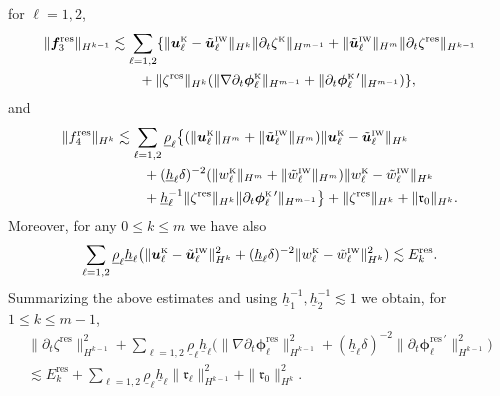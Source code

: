 \documentclass[11pt,leqno]{article}
\numberwithin{equation}{section}
\numberwithin{figure}{section}
\begin{document}
%
for $\ell=1,2$, 
%
\begin{align*}
\|\bm{f}_3^\mathrm{res}\|_{H^{k-1}}
&\lesssim \sum_{\ell=1,2}\{
 \|\bm{u}_\ell^{\mbox{\rm\tiny K}}-\tilde{\bm{u}}_\ell^{\mbox{\rm\tiny IW}}\|_{H^k}
  \|\partial_t\zeta^{\mbox{\rm\tiny K}}\|_{H^{m-1}}
 + \|\tilde{\bm{u}}_\ell^{\mbox{\rm\tiny IW}}\|_{H^m}\|\partial_t\zeta^\mathrm{res}\|_{H^{k-1}}\\
&\qquad
 + \|\zeta^\mathrm{res}\|_{H^k}( \|\nabla\partial_t \bm{\phi}_\ell^{\mbox{\rm\tiny K}}\|_{H^{m-1}}
  + \|\partial_t\bm{\phi}_\ell^{\mbox{\rm\tiny K} \, \prime}\|_{H^{m-1}} ) \},
\end{align*}
%
and 
%
\begin{align*}
\|f_4^\mathrm{res}\|_{H^k}
&\lesssim \sum_{\ell=1,2}\underline{\rho}_\ell \big\{
 (\|\bm{u}_\ell^{\mbox{\rm\tiny K}}\|_{H^m}+\|\tilde{\bm{u}}_\ell^{\mbox{\rm\tiny IW}}\|_{H^m})
 \|\bm{u}_\ell^{\mbox{\rm\tiny K}}-\tilde{\bm{u}}_\ell^{\mbox{\rm\tiny IW}}\|_{H^k} \\
&\qquad
 + (\underline{h}_\ell\delta)^{-2}(\|w_\ell^{\mbox{\rm\tiny K}}\|_{H^m}+\|\tilde{w}_\ell^{\mbox{\rm\tiny IW}}\|_{H^m})
 \|w_\ell^{\mbox{\rm\tiny K}}-\tilde{w}_\ell^{\mbox{\rm\tiny IW}}\|_{H^k} \\
&\qquad
 + \underline{h}_\ell^{-1} \|\zeta^\mathrm{res}\|_{H^k} \|\partial_t\bm{\phi}_\ell^{\mbox{\rm\tiny K} \, \prime}\|_{H^{m-1}}  \big\} 
 + \|\zeta^\mathrm{res}\|_{H^k} +\|\mathfrak{r}_0\|_{H^k}.
\end{align*}
%
Moreover, for any $0\leq k\leq m$ we have also 
%
\begin{equation}\label{estimate-uw-res}
\sum_{\ell=1,2}\underline{\rho}_\ell \underline{h}_\ell \bigl(
 \|\bm{u}_\ell^{\mbox{\rm\tiny K}}-\tilde{\bm{u}}_\ell^{\mbox{\rm\tiny IW}}\|_{H^k}^2
 + (\underline{h}_\ell\delta)^{-2}\|w_\ell^{\mbox{\rm\tiny K}}-\tilde{w}_\ell^{\mbox{\rm\tiny IW}}\|_{H^k}^2) 
\lesssim E_k^\mathrm{res}. 
\end{equation}
%
Summarizing the above estimates and using $\underline{h}_1^{-1}, \underline{h}_2^{-1}\lesssim 1$ we obtain, 
for $1\leq k\leq m-1$, 
%
\begin{align}\label{estimate-dtphi-res}
 \|\partial_t\zeta^\mathrm{res}\|_{H^{k-1}}^2
 + \sum_{\ell=1,2}\underline{\rho}_\ell \underline{h}_\ell \bigl(
 \|\nabla\partial_t\bm{\phi}_\ell^\mathrm{res}\|_{H^{k-1}}^2
  + (\underline{h}_\ell\delta)^{-2}\|\partial_t\bm{\phi}_\ell^{\mathrm{res}\,\prime}\|_{H^{k-1}}^2 \bigr) \\
\lesssim E_k^\mathrm{res} + \sum_{\ell=1,2}\underline{\rho}_\ell\underline{h}_\ell\|\bm{\mathfrak{r}}_\ell\|_{H^{k-1}}^2
 + \|\mathfrak{r}_0\|_{H^k}^2. \nonumber
\end{align}
\end{document}
